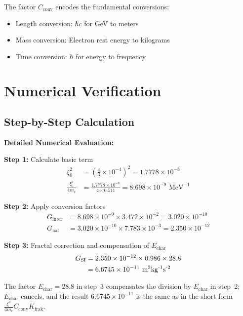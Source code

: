 	The factor $C_{\text{conv}}$ encodes the fundamental conversions:
	\begin{itemize}
		\item Length conversion: $\hbar c$ for GeV to meters
		\item Mass conversion: Electron rest energy to kilograms
		\item Time conversion: $\hbar$ for energy to frequency
	\end{itemize}
	
	\section{Numerical Verification}
	
	\subsection{Step-by-Step Calculation}
	
	\begin{verification}
		\textbf{Detailed Numerical Evaluation:}
		
		\textbf{Step 1:} Calculate basic term
		\begin{align}
			\xi_0^2 &= \left(\frac{4}{3} \times 10^{-4}\right)^2 = 1.7778 \times 10^{-8} \\
			\frac{\xi_0^2}{4 m_e} &= \frac{1.7778 \times 10^{-8}}{4 \times 0.511} = 8.698 \times 10^{-9} \text{ MeV}^{-1}
		\end{align}
		
		\textbf{Step 2:} Apply conversion factors
		\begin{align}
			G_{\text{inter}} &= 8.698 \times 10^{-9} \times 3.472 \times 10^{-2} = 3.020 \times 10^{-10} \\
			G_{\text{nat}} &= 3.020 \times 10^{-10} \times 7.783 \times 10^{-3} = 2.350 \times 10^{-12}
		\end{align}
		
		\textbf{Step 3:} Fractal correction and compensation of $E_{\text{char}}$
		\begin{align}
			G_{\text{SI}} &= 2.350 \times 10^{-12} \times 0.986 \times 28.8 \\
			&= 6.6745 \times 10^{-11} \text{ m\textsuperscript{3}kg\textsuperscript{-1}s\textsuperscript{-2}}
		\end{align}

		The factor $E_{\text{char}} = 28.8$ in step~3 compensates the division by $E_{\text{char}}$ in step~2; $E_{\text{char}}$ cancels, and the result $6.6745\times10^{-11}$ is the same as in the short form $\frac{\xi^2}{4m_e}C_{\text{conv}}K_{\text{frak}}$.
	\end{verification}
	
